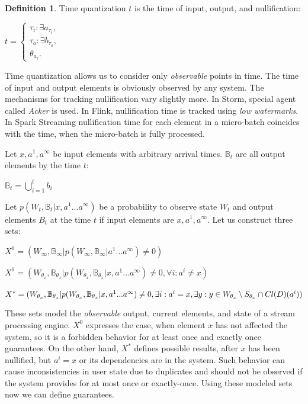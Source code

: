 \documentclass[sigconf]{acmart}
\theoremstyle{definition}
\newtheorem{definition}{Definition}
\begin{document}
\begin{definition}{Time quantization}
$t$ is the time of input, output, and nullification:

$t=\begin{cases}
\tau_i:\exists{a_{\tau_i}}, \\
\tau_o:\exists{b_{\tau_o}}, \\
\theta_{a_\tau}.
\end{cases}$
\end{definition}

Time quantization allows us to consider only {\em observable} points in time. The time of input and output elements is obviously observed by any system. The mechanisms for tracking nullification vary slightly more. In Storm, special agent called {\em Acker} is used. In Flink, nullification time is tracked using {\em low watermarks}. In Spark Streaming nullification time for each element in a micro-batch coincides with the time, when the micro-batch is fully processed.

Let $x,a^{1},a^\infty$ be input elements with arbitrary arrival times. $\mathbb{B}_t$ are all output elements by the time $t$:

$\mathbb{B}_t=\bigcup\limits_{i=1}^{t}{b_i}$

Let $p(W_t,\mathbb{B}_t|x,a^{1}...a^\infty)$ be a probability to observe state $W_t$ and output elements $B_t$ at the time $t$ if input elements are $x,a^{1},a^\infty$. Let us construct three sets:

$X^0=(W_\infty,\mathbb{B}_\infty|p(W_\infty,\mathbb{B}_\infty|a^{1}...a^\infty)\neq{0})$

$X^1=(W_{\theta_{x}},\mathbb{B}_{\theta_{x}}|p(W_{\theta_{x}},\mathbb{B}_{\theta_{x}}|x,a^{1}...a^\infty)\neq{0},\forall{i}:{a^i}\neq{x})$

$X^{*}=(W_{\theta_{x}},\mathbb{B}_{\theta_{x}}|p(W_{\theta_{x}},\mathbb{B}_{\theta_{x}}|x,a^{1}...a^\infty)\neq{0},\\
\exists{i}:{a^i={x}},\exists{y:y\in{W_{\theta_{x}}\setminus{S_{\theta_x}}}\cap{Cl(D)(a^i)}})$

These sets model the {\em observable} output, current elements, and state of a stream processing engine. $X^0$ expresses the case, when element $x$ has not affected the system, so it is a forbidden behavior for at least once and exactly once guarantees. On the other hand, $X^{*}$ defines possible results, after $x$ has been nullified, but $a^i=x$ or its dependencies are in the system. Such behavior can cause inconsistencies in user state due to duplicates and should not be observed if the system provides for at most once or exactly-once. Using these modeled sets now we can define guarantees.
\end{document}
